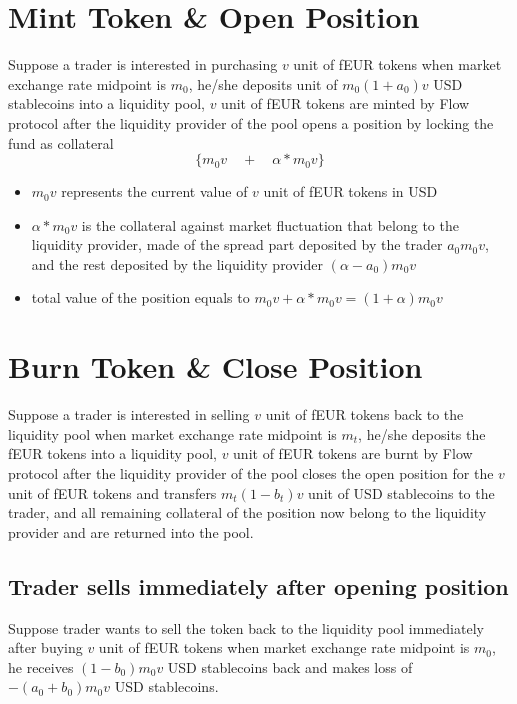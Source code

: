 \documentclass{article}
\begin{document}
\section{Mint Token \& Open Position}
Suppose a trader is interested in purchasing $v$ unit of fEUR tokens when market exchange rate midpoint is $m_0$, he/she deposits unit of $m_0(1+a_0)v$ USD stablecoins into a liquidity pool, $v$ unit of fEUR tokens are minted by Flow protocol after the liquidity provider of the pool opens a position by locking the fund as collateral
$$\{ m_0v  \quad +  \quad \alpha*m_0v \}$$

\begin{itemize}
    
    \item $m_0v$ represents the current value of $v$ unit of fEUR tokens in USD
    
    \item $\alpha*m_0 v$ is the collateral against market fluctuation that belong to the liquidity provider, made of the spread part deposited by the trader $ a_0 m_0 v$, and the rest deposited by the liquidity provider $(\alpha-a_0)m_0v$
   
    \item total value of the position equals to  $m_0v + \alpha*m_0v = (1+\alpha)m_0 v$

\end{itemize}

\section{Burn Token \& Close Position}
Suppose a trader is interested in selling $v$ unit of fEUR tokens back to the liquidity pool when market exchange rate midpoint is $m_t$, he/she deposits the fEUR tokens into a liquidity pool, $v$ unit of fEUR tokens are burnt by Flow protocol after the liquidity provider of the pool closes the open position for the $v$ unit of fEUR tokens and transfers $m_t(1-b_t)v$ unit of USD stablecoins to the trader, and all remaining collateral of the position now belong to the liquidity provider and are returned into the pool. 

\subsection{Trader sells immediately after opening position}
Suppose trader wants to sell the token back to the liquidity pool immediately after buying $v$ unit of fEUR tokens when market exchange rate midpoint is $m_0$, he receives $(1-b_0)m_0 v$ USD stablecoins back and makes loss of $-(a_0+b_0) m_0 v$ USD stablecoins. \par
\end{document}
